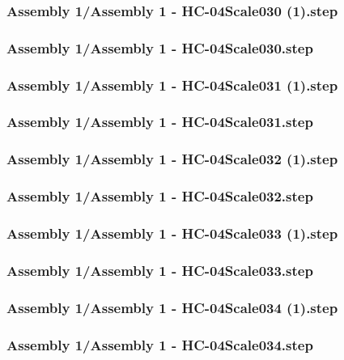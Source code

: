 \documentclass[a4paper,12pt]{article}
\begin{document}
\subsubsection{Assembly 1/Assembly 1 - HC-04Scale030 (1).step}

\subsubsection{Assembly 1/Assembly 1 - HC-04Scale030.step}

\subsubsection{Assembly 1/Assembly 1 - HC-04Scale031 (1).step}

\subsubsection{Assembly 1/Assembly 1 - HC-04Scale031.step}

\subsubsection{Assembly 1/Assembly 1 - HC-04Scale032 (1).step}

\subsubsection{Assembly 1/Assembly 1 - HC-04Scale032.step}

\subsubsection{Assembly 1/Assembly 1 - HC-04Scale033 (1).step}

\subsubsection{Assembly 1/Assembly 1 - HC-04Scale033.step}

\subsubsection{Assembly 1/Assembly 1 - HC-04Scale034 (1).step}

\subsubsection{Assembly 1/Assembly 1 - HC-04Scale034.step}

\end{document}
